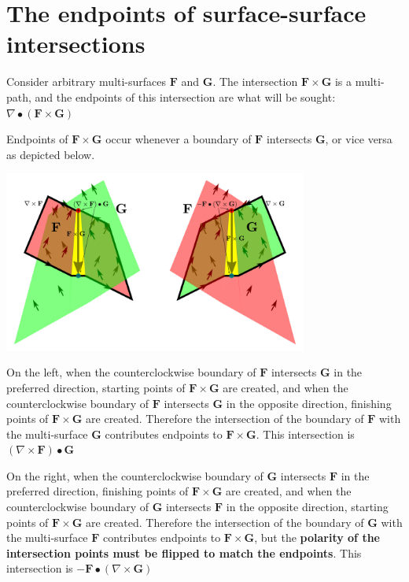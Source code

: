 \section{The endpoints of surface-surface intersections}

Consider arbitrary multi-surfaces \(\mathbf{F}\) and \(\mathbf{G}\). The intersection \(\mathbf{F} \times \mathbf{G}\) is a multi-path, and the endpoints of this intersection are what will be sought: \(\nabla \bullet (\mathbf{F} \times \mathbf{G})\)

Endpoints of \(\mathbf{F} \times \mathbf{G}\) occur whenever a boundary of \(\mathbf{F}\) intersects \(\mathbf{G}\), or vice versa as depicted below. 

\begin{center}
\includegraphics[width = 0.75\textwidth]{Boundaries/Path_endpoints/surface_surface_intersection_endpoints_2}
\end{center}

On the left, when the counterclockwise boundary of \(\mathbf{F}\) intersects \(\mathbf{G}\) in the preferred direction, starting points of \(\mathbf{F} \times \mathbf{G}\) are created, and when the counterclockwise boundary of \(\mathbf{F}\) intersects \(\mathbf{G}\) in the opposite direction, finishing points of \(\mathbf{F} \times \mathbf{G}\) are created. Therefore the intersection of the boundary of \(\mathbf{F}\) with the multi-surface \(\mathbf{G}\) contributes endpoints to \(\mathbf{F} \times \mathbf{G}\). This intersection is \((\nabla \times \mathbf{F}) \bullet \mathbf{G}\)

On the right, when the counterclockwise boundary of \(\mathbf{G}\) intersects \(\mathbf{F}\) in the preferred direction, finishing points of \(\mathbf{F} \times \mathbf{G}\) are created, and when the counterclockwise boundary of \(\mathbf{G}\) intersects \(\mathbf{F}\) in the opposite direction, starting points of \(\mathbf{F} \times \mathbf{G}\) are created. Therefore the intersection of the boundary of \(\mathbf{G}\) with the multi-surface \(\mathbf{F}\) contributes endpoints to \(\mathbf{F} \times \mathbf{G}\), but the {\bf polarity of the intersection points must be flipped to match the endpoints}. This intersection is \(-\mathbf{F} \bullet (\nabla \times \mathbf{G})\)

